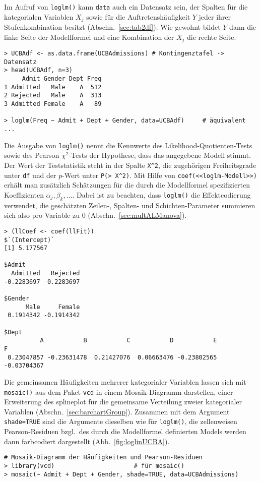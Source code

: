 Im Aufruf von \lstinline!loglm()! kann \lstinline!data! auch ein Datensatz sein, der Spalten für die kategorialen Variablen $X_{j}$ sowie für die Auftretenshäufigkeit $Y$ jeder ihrer Stufenkombination besitzt (Abschn.\ \ref{sec:tab2df}). Wie gewohnt bildet $Y$ dann die linke Seite der Modellformel und eine Kombination der $X_{j}$ die rechte Seite.
\begin{lstlisting}
> UCBAdf <- as.data.frame(UCBAdmissions) # Kontingenztafel -> Datensatz
> head(UCBAdf, n=3)
     Admit Gender Dept Freq
1 Admitted   Male    A  512
2 Rejected   Male    A  313
3 Admitted Female    A   89

> loglm(Freq ~ Admit + Dept + Gender, data=UCBAdf)     # äquivalent ...
\end{lstlisting}

Die Ausgabe von \lstinline!loglm()! nennt die Kennwerte des Likelihood-Quotienten-Tests sowie des Pearson $\chi^{2}$-Tests der Hypothese, dass das angegebene Modell stimmt. Der Wert der Teststatistik steht in der Spalte \lstinline!X^2!, die zugehörigen Freiheitsgrade unter \lstinline!df! und der $p$-Wert unter \lstinline!P(> X^2)!. Mit Hilfe von \lstinline!coef(<<loglm-Modell>>)! erhält man zusätzlich Schätzungen für die durch die Modellformel spezifizierten Koeffizienten $\alpha_{j}, \beta_{k}, \ldots$. Dabei ist zu beachten, dass \lstinline!loglm()! die Effektcodierung verwendet, die geschätzten Zeilen-, Spalten- und Schichten-Parameter summieren sich also pro Variable zu $0$ (Abschn.\ \ref{sec:multALManova}).
\begin{lstlisting}
> (llCoef <- coef(llFit))
$`(Intercept)`
[1] 5.177567

$Admit
  Admitted   Rejected
-0.2283697  0.2283697

$Gender
      Male     Female
 0.1914342 -0.1914342

$Dept
          A           B           C           D           E           F
 0.23047857 -0.23631478  0.21427076  0.06663476 -0.23802565 -0.03704367
\end{lstlisting}

Die gemeinsamen Häufigkeiten mehrerer kategorialer Variablen lassen sich mit  \lstinline!mosaic()! aus dem Paket \lstinline!vcd! in einem Mosaik-Diagramm darstellen, einer Erweiterung des splineplot für die gemeinsame Verteilung zweier kategorialer Variablen (Abschn.\ \ref{sec:barchartGroup}). Zusammen mit dem Argument \lstinline!shade=TRUE! sind die Argumente dieselben wie für \lstinline!loglm()!, die zellenweisen Pearson-Residuen bzgl.\ des durch die Modellformel definierten Models werden dann farbcodiert dargestellt (Abb.\ \ref{fig:loglinUCBA}).
\begin{lstlisting}
# Mosaik-Diagramm der Häufigkeiten und Pearson-Residuen
> library(vcd)                      # für mosaic()
> mosaic(~ Admit + Dept + Gender, shade=TRUE, data=UCBAdmissions)
\end{lstlisting}

